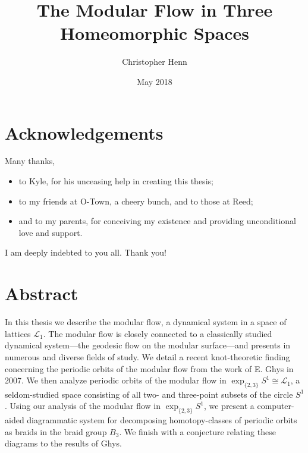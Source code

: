 \documentclass[12pt,twoside]{reedthesis}
\title{The Modular Flow in Three Homeomorphic Spaces}
\author{Christopher Henn}
\date{May 2018}
\theoremstyle{definition}
\newcommand{\LS}{\mathcal{L}}
\newcommand{\exptwothree}{\exp_{\{2,3\}}}
\begin{document}
\setlength{\abovedisplayshortskip}{1em}
\setlength{\belowdisplayshortskip}{1em}
\setlength{\abovedisplayskip}{1em}
\setlength{\belowdisplayskip}{1em}

\maketitle
\frontmatter
\pagestyle{empty}

\chapter*{Acknowledgements}

Many thanks,

\begin{itemize}
  \item to Kyle, for his unceasing help in creating this thesis;

  \item to my friends at O-Town, a cheery bunch, and to those at Reed;

  \item and to my parents, for conceiving my existence and providing unconditional love and support.
\end{itemize}

I am deeply indebted to you all.
Thank you!

\setlength{\parskip}{0.2em}
\tableofcontents
\setlength{\parskip}{1em}

\chapter*{Abstract}

In this thesis we describe the modular flow, a dynamical system in a space of lattices $\LS_1$.
The modular flow is closely connected to a classically studied dynamical system---the geodesic flow on the modular surface---and presents in numerous and diverse fields of study.
We detail a recent knot-theoretic finding concerning the periodic orbits of the modular flow from the work of E. Ghys in 2007.
We then analyze periodic orbits of the modular flow in $\exptwothree S^1 \cong \LS_1$, a seldom-studied space consisting of all two- and three-point subsets of the circle $S^1$.
Using our analysis of the modular flow in $\exptwothree S^1$, we present a computer-aided diagrammatic system for decomposing homotopy-classes of periodic orbits as braids in the braid group $B_3$.
We finish with a conjecture relating these diagrams to the results of Ghys.
\end{document}

